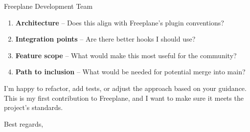 \documentclass[11pt]{letter}
\begin{document}
\begin{letter}{Freeplane Development Team}
\begin{enumerate}[nosep]
    \item \textbf{Architecture} -- Does this align with Freeplane's plugin conventions?
    \item \textbf{Integration points} -- Are there better hooks I should use?
    \item \textbf{Feature scope} -- What would make this most useful for the community?
    \item \textbf{Path to inclusion} -- What would be needed for potential merge into main?
\end{enumerate}

I'm happy to refactor, add tests, or adjust the approach based on your guidance. This is my first contribution to Freeplane, and I want to make sure it meets the project's standards.

\closing{Best regards,}

\end{letter}
\end{document}
